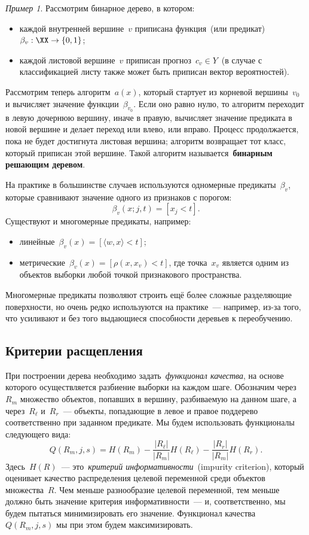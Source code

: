 \documentclass[a4paper, 12pt]{article}
\theoremstyle{plain} %
\theoremstyle{definition} %
\theoremstyle{remark} %
\newtheorem{example}{Пример}
\begin{document}
\begin{example}
Рассмотрим бинарное дерево, в котором:
\begin{itemize}
    \item каждой внутренней вершине~$v$ приписана функция~(или предикат)~$\beta_v: \XX \to \{0, 1\}$;
    \item каждой листовой вершине~$v$ приписан прогноз~$c_v \in Y$~(в случае с классификацией
        листу также может быть приписан вектор вероятностей).
\end{itemize}
Рассмотрим теперь алгоритм~$a(x)$, который стартует из корневой вершины~$v_0$
и вычисляет значение функции~$\beta_{v_0}$.
Если оно равно нулю, то алгоритм переходит в левую дочернюю вершину, иначе в правую,
вычисляет значение предиката в новой вершине и делает переход или влево, или вправо.
Процесс продолжается, пока не будет достигнута листовая вершина;
алгоритм возвращает тот класс, который приписан этой вершине.
Такой алгоритм называется~\textbf{бинарным решающим деревом}.

На практике в большинстве случаев используются одномерные предикаты~$\beta_v$,
которые сравнивают значение одного из признаков с порогом:
\[
    \beta_v(x; j, t)
    =
    [x_j < t].
\]
Существуют и многомерные предикаты, например:
\begin{itemize}
    \item линейные~$\beta_v(x) = [\langle w, x \rangle < t]$;
    \item метрические~$\beta_v(x) = [\rho(x, x_v) < t]$, где точка~$x_v$ является одним из объектов выборки любой точкой
        признакового пространства.
\end{itemize}
Многомерные предикаты позволяют строить ещё более сложные разделяющие поверхности,
но очень редко используются на практике~--- например, из-за того,
что усиливают и без того выдающиеся способности деревьев к переобучению.

\subsection{Критерии расщепления}
При построении дерева необходимо задать~\emph{функционал качества},
на основе которого осуществляется разбиение выборки на каждом шаге.
Обозначим через~$R_m$ множество объектов, попавших в вершину, разбиваемую на данном шаге,
а через~$R_\ell$ и~$R_r$~--- объекты, попадающие в левое и правое поддерево соответственно
при заданном предикате.
Мы будем использовать функционалы следующего вида:
\[
    Q(R_m, j, s)
    =
    H(R_m)
    -
    \frac{|R_\ell|}{|R_m|}
    H(R_\ell)
    -
    \frac{|R_r|}{|R_m|}
    H(R_r).
\]
Здесь~$H(R)$~--- это~\emph{критерий информативности}~(impurity criterion),
который оценивает качество распределения целевой переменной среди объектов множества~$R$.
Чем меньше разнообразие целевой переменной, тем меньше должно быть значение критерия информативности~---
и, соответственно, мы будем пытаться минимизировать его значение.
Функционал качества~$Q(R_m, j, s)$ мы при этом будем максимизировать.


\end{example}
\end{document}
